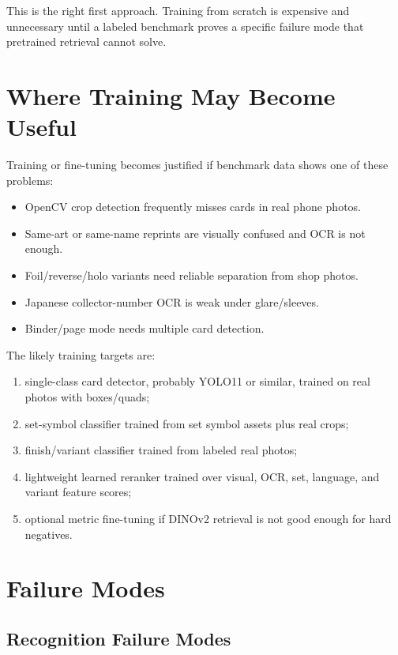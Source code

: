 \documentclass[11pt,a4paper]{article}
\begin{document}
This is the right first approach. Training from scratch is expensive and unnecessary until a labeled benchmark proves a specific failure mode that pretrained retrieval cannot solve.

\section{Where Training May Become Useful}

Training or fine-tuning becomes justified if benchmark data shows one of these problems:

\begin{itemize}
  \item OpenCV crop detection frequently misses cards in real phone photos.
  \item Same-art or same-name reprints are visually confused and OCR is not enough.
  \item Foil/reverse/holo variants need reliable separation from shop photos.
  \item Japanese collector-number OCR is weak under glare/sleeves.
  \item Binder/page mode needs multiple card detection.
\end{itemize}

The likely training targets are:

\begin{enumerate}
  \item single-class card detector, probably YOLO11 or similar, trained on real photos with boxes/quads;
  \item set-symbol classifier trained from set symbol assets plus real crops;
  \item finish/variant classifier trained from labeled real photos;
  \item lightweight learned reranker trained over visual, OCR, set, language, and variant feature scores;
  \item optional metric fine-tuning if DINOv2 retrieval is not good enough for hard negatives.
\end{enumerate}

\section{Failure Modes}

\subsection{Recognition Failure Modes}
\end{document}
